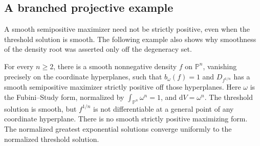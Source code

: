 \subsection{A branched projective example}

A smooth semipositive maximizer need not be strictly positive, even when the threshold solution is smooth. The following example also shows why smoothness of the density root was asserted only off the degeneracy set.

\begin{example}\label{ex:semipositive-projective-maximizer}
For every $n\geq2$, there is a smooth nonnegative density $f$ on $\mathbb P^n$, vanishing precisely on the coordinate hyperplanes, such that $b_\omega(f)=1$ and $D_{f^{1/n}}$ has a smooth semipositive maximizer strictly positive off those hyperplanes. Here $\omega$ is the Fubini--Study form, normalized by $\int_{\mathbb P^n}\omega^n=1$, and $\mathrm{d}V=\omega^n$. The threshold solution is smooth, but $f^{1/n}$ is not differentiable at a general point of any coordinate hyperplane. There is no smooth strictly positive maximizing form. The normalized greatest exponential solutions converge uniformly to the normalized threshold solution.
\end{example}
